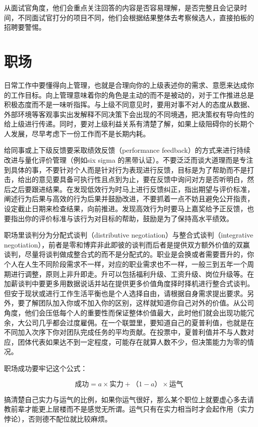\documentclass[]{tufte-book}
\begin{document}
从面试官角度，他们会重点关注回答的内容是否容易理解，是否完整且会记录时间，不同面试官打分的项目不同，他们会根据结果整体去考察候选人，直接拍板的招聘要警惕。

\hypertarget{ux804cux573a}{%
\section{职场}\label{ux804cux573a}}

日常工作中要懂得向上管理，也就是合理向你的上级表述你的需求、意愿来达成你的工作目标。向上管理意味着你的角色是主动的而不是被动的，对于工作推进总是积极态度而不是一味听指挥。与上级不同意见时，要用对事不对人的态度从数据、外部环境等客观事实出发解释不同决策下会出现的不同境遇，把决策权有导向性的给上级进行传递。同时，要对上级利益关系有清楚了解，如果上级阻碍你的长期个人发展，尽早考虑下一份工作而不是长期内耗。

给同事或上下级反馈要采取绩效反馈（performance feedback）的方式来进行持续改进与量化评价管理（例如six sigma 的黑带认证）。不要泛泛而谈大道理而是专注到具体的事，不要针对个人而是针对行为表现进行反馈，目标是为了帮助而不是打击，给出的意见要具备可执行性且点到为止，要在反馈中询问对方是否听明白，然后之后要跟进结果。在发现低效行为时马上进行反馈纠正，指出期望与评价标准，阐述行为后果与高效的行为后果并鼓励改进，不要抓着一点不妨且避免公开指责，设定截止日期来检查结果，向前推进。发现高效行为时要马上嘉奖给予正反馈，也要指出你的评价标准与该行为对目标的帮助，鼓励是为了保持高水平绩效。

职场里谈判分为分配式谈判（distributive negotiation）与整合式谈判（integrative negotiation），前者是零和博弈非此即彼的谈判而后者是提供双方额外价值的双赢谈判，尽量将谈判做成整合式的而不是分配式的。职业是会换或者需要晋升的，你个人在人生不同阶段需求不一样，对应的职业需求也不一样，一般三到五年一个周期进行调整，原则上非升即走。升可以包括福利升级、工资升级、岗位升级等。在加薪谈判中要更多用数据说话并站在提供更多价值角度择时择机进行整合式谈判。但安于现状或进行工作生活平衡也是个人选择自由，请根据自身需求提出要求。另外，要了解团队加入你或不加入你的区别，这样就知道你自己对外的价值。从公司角度，他们会压低每个人的重要性而保证整体价值最大，此时他们就会出现功能冗余，大公司几乎都会过度雇佣。在一个联盟里，要知道自己的夏普利值，也就是在不同加入次序下你对团队完成任务的平均贡献。在投票中，夏普利值并不与人数对应，团体代表如果达不到一定程度，可能存在就算人数不少，但决策能力为零的情况。

职场成功要牢记这个公式：

\[成功=a×实力+（1-a）×运气\]

搞清楚自己实力与运气的比例，如果你运气很好，那么某个职位上就要虚心多去请教前辈才能更上层楼而不是感觉无所谓。运气只有在实力相当时才会起作用（实力悖论），否则德不配位就比较麻烦。
\end{document}
